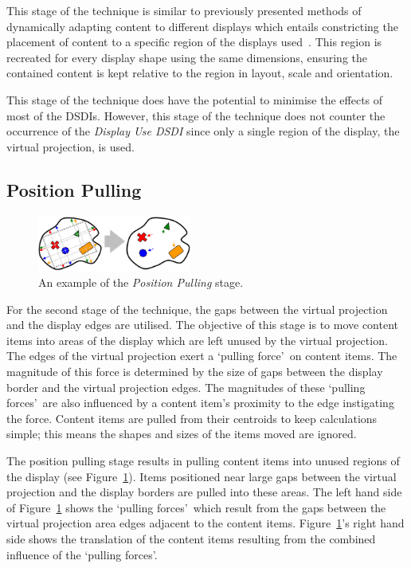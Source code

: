 \documentclass[twocolumn,compsoc]{cvm}
\begin{document}
This stage of the technique is similar to previously presented methods of dynamically adapting content to different displays which entails constricting the placement of content to a specific region of the displays used~\cite{Cotting2006,Raskar2003}.
This region is recreated for every display shape using the same dimensions, ensuring the contained content is kept relative to the region in layout, scale and orientation.

This stage of the technique does have the potential to minimise the effects of most of the \acp{DSDI}.
However, this stage of the technique does not counter the occurrence of the {\emph{Display Use \ac{DSDI}}} since only a single region of the display, the virtual projection, is used.

\subsection{Position Pulling}
\label{subsec:positionpulling} 

\begin{figure}[h!] 
 \centering
   \includegraphics[width=0.45\textwidth]{figures/PositionPulling.jpeg}
   \caption{An example of the {\emph{Position Pulling}} stage.}
   \label{fig:pullLayout}
\end{figure}

For the second stage of the technique, the gaps between the virtual projection and the display edges are utilised.
The objective of this stage is to move content items into areas of the display which are left unused by the virtual projection.
The edges of the virtual projection exert a \lq pulling force\rq\ on content items.
The magnitude of this force is determined by the size of gaps between the display border and the virtual projection edges.
The magnitudes of these \lq pulling forces\rq\ are also influenced by a content item's proximity to the edge instigating the force.
Content items are pulled from their centroids to keep calculations simple; this means the shapes and sizes of the items moved are ignored.

The position pulling stage results in pulling content items into unused regions of the display (see
Figure~\ref{fig:pullLayout}).
Items positioned near large gaps between the virtual projection and the display borders are pulled into these areas.
The left hand side of Figure~\ref{fig:pullLayout} shows the \lq pulling forces\rq\ which result from the gaps between the virtual projection area edges adjacent to the content items.
Figure~\ref{fig:pullLayout}'s right hand side shows the translation of the content items resulting from the combined influence of the \lq pulling forces\rq .
\end{document}
